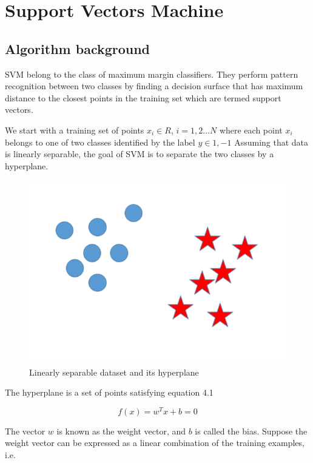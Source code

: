 \chapter{Support Vectors Machine}

\section{Algorithm background}

SVM belong to the class of maximum margin classifiers. They perform pattern recognition between two classes by finding a decision surface that has maximum distance to the closest points in the training set which are termed support vectors.

We start with a training set of points $x_{i} \in R$, $i = 1,2 ... N$ where each point $x_{i}$ belongs to one of two classes identified by the label $y \in { {1,-1} }$ Assuming that data is linearly separable, the goal of SVM is to separate the two classes by a hyperplane.

\begin{figure}[H]
\centering
\includegraphics[scale=0.5]{img/svm/linear.png}
\caption{Linearly separable dataset and its hyperplane}
\end{figure} 

The hyperplane is a set of points satisfying equation 4.1

\begin{equation}
f(x) = w^T x + b = 0
\end{equation}

The vector $w$ is known as the weight vector, and $b$ is called the bias. 
Suppose the weight vector can be expressed as a linear combination of the training examples, i.e.

